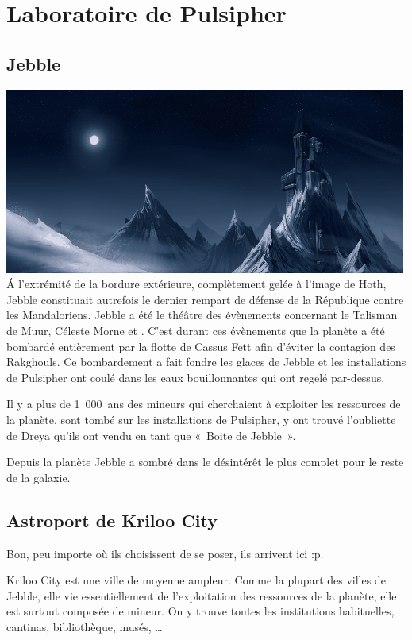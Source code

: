\section{Laboratoire de Pulsipher}

\subsection{Jebble}\label{sec:jebble}
\noindent\includegraphics[width=\linewidth]{_img/dos-au-muur/jebble.png}
\'A l’extrémité de la bordure extérieure, complètement gelée à l’image de Hoth, Jebble constituait autrefois le dernier rempart de défense de la République contre les Mandaloriens. Jebble a été le théâtre des évènements concernant le Talisman de Muur, Céleste Morne et . C’est durant ces évènements que la planète a été bombardé entièrement par la flotte de Cassus Fett afin d’éviter la contagion des Rakghouls. Ce bombardement a fait fondre les glaces de Jebble et les installations de Pulsipher ont coulé dans les eaux bouillonnantes qui ont regelé par-dessus.

Il y a plus de 1~000~ans des mineurs qui cherchaient à exploiter les ressources de la planète, sont tombé sur les installations de Pulsipher, y ont trouvé l’oubliette de Dreya qu’ils ont vendu en tant que «~Boite de Jebble~».

Depuis la planète Jebble a sombré dans le désintérêt le plus complet pour le reste de la galaxie.

\subsection{Astroport de Kriloo City}
Bon, peu importe où ils choisissent de se poser, ils arrivent ici :p.

Kriloo City est une ville de moyenne ampleur. Comme la plupart des villes de Jebble, elle vie essentiellement de l’exploitation des ressources de la planète, elle est surtout composée de mineur. On y trouve toutes les institutions habituelles, cantinas, bibliothèque, musés, \ldots

